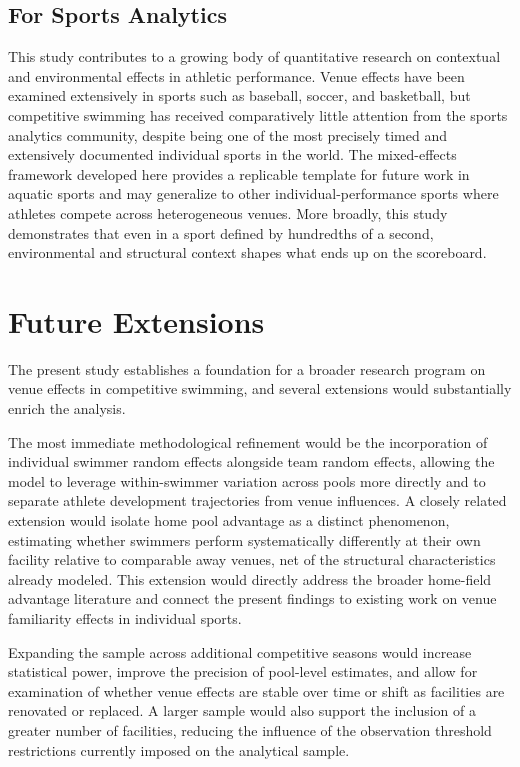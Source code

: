 \documentclass[12pt]{article}
\begin{document}
\subsection{For Sports Analytics}

This study contributes to a growing body of quantitative research on contextual
and environmental effects in athletic performance. Venue effects have been
examined extensively in sports such as baseball, soccer, and basketball, but
competitive swimming has received comparatively little attention from the sports
analytics community, despite being one of the most precisely timed and
extensively documented individual sports in the world. The mixed-effects
framework developed here provides a replicable template for future work in
aquatic sports and may generalize to other individual-performance sports where
athletes compete across heterogeneous venues. More broadly, this study
demonstrates that even in a sport defined by hundredths of a second,
environmental and structural context shapes what ends up on the scoreboard.

\section{Future Extensions}
\label{sec:future}

The present study establishes a foundation for a broader research program on
venue effects in competitive swimming, and several extensions would
substantially enrich the analysis.

The most immediate methodological refinement would be the incorporation of
individual swimmer random effects alongside team random effects, allowing the
model to leverage within-swimmer variation across pools more directly and to
separate athlete development trajectories from venue influences. A closely
related extension would isolate home pool advantage as a distinct phenomenon,
estimating whether swimmers perform systematically differently at their own
facility relative to comparable away venues, net of the structural
characteristics already modeled. This extension would directly address the
broader home-field advantage literature and connect the present findings to
existing work on venue familiarity effects in individual sports.

Expanding the sample across additional competitive seasons would increase
statistical power, improve the precision of pool-level estimates, and allow for
examination of whether venue effects are stable over time or shift as facilities
are renovated or replaced. A larger sample would also support the inclusion of
a greater number of facilities, reducing the influence of the observation
threshold restrictions currently imposed on the analytical sample.
\end{document}
